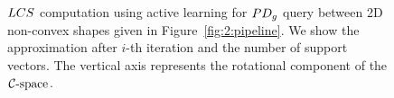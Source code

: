 \begin{figure}[!htb]
\begin{center}
\caption[$\LCS$ computation using active learning for $\PDg$ query between 2D non-convex shapes]{$\LCS$ computation using active learning for $\PDg$ query between 2D non-convex shapes given in Figure~\ref{fig:2:pipeline}. We show the approximation after $i$-th iteration and the number of support vectors. The vertical axis represents the rotational component of the $\mathcal C\text{-space}$. }
\label{fig:2:LCSinActiveLearning2D2}
\end{center}
\end{figure}

